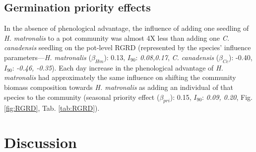 \documentclass{article}[11pt]
\begin{document}
\subsection*{Germination priority effects}
In the absence of phenological advantage, the influence  of adding one seedling of \textit{H. matronalis} to a pot community was almost 4X less than adding one \textit{C. canadensis} seedling on the pot-level RGRD (represented by the species' influence parameters---\textit{H. matronalis} ($\beta_{Hm}$): 0.13, $I_{90}$: \textit{0.08,0.17}, \textit{C. canadensis} ($\beta_{Cc}$): -0.40, $I_{90}$: \textit{-0.46, -0.35}). Each day increase in the phenological advantage of \textit{ H. matronalis} had approximately the same influence on shifting the community biomass composition towards \textit{H. matronalis} as adding an individual of that species to the community (seasonal priority effect ($\beta_{pri}$): 0.15, $I_{90}$: \textit{0.09, 0.20}, Fig. \ref{fig:RGRD}, Tab. \ref{tab:RGRD}). %


\section*{Discussion}
\end{document}
